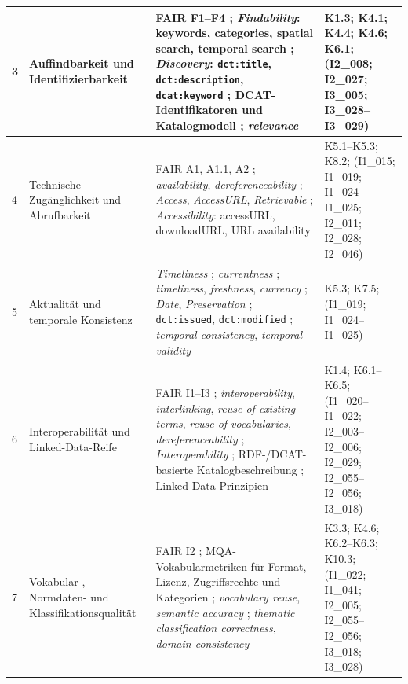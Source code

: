 \begin{center}
\begin{longtable}{p{} p{} p{} p{}}
3 &
Auffindbarkeit und Identifizierbarkeit &
FAIR F1--F4 \cite{wilkinson2016fair}; \textit{Findability}: keywords, categories, spatial search, temporal search \cite{wentzel2023extensive,data_europa}; \textit{Discovery}: \texttt{dct:title}, \texttt{dct:description}, \texttt{dcat:keyword} \cite{Neumaier2016MetadataQuality}; DCAT-Identifikatoren und Katalogmodell \cite{W3CDCAT3}; \textit{relevance} \cite{wang1996beyond,Zaveri2016LinkedDataQuality} &
K1.3; K4.1; K4.4; K4.6; K6.1; (I2\_008; I2\_027; I3\_005; I3\_028--I3\_029) \\ \hline

4 &
Technische Zugänglichkeit und Abrufbarkeit &
FAIR A1, A1.1, A2 \cite{wilkinson2016fair}; \textit{availability}, \textit{dereferenceability} \cite{Zaveri2016LinkedDataQuality}; \textit{Access}, \textit{AccessURL}, \textit{Retrievable} \cite{Neumaier2016MetadataQuality}; \textit{Accessibility}: accessURL, downloadURL, URL availability \cite{wentzel2023extensive,data_europa} &
K5.1--K5.3; K8.2; (I1\_015; I1\_019; I1\_024--I1\_025; I2\_011; I2\_028; I2\_046) \\ \hline

5 &
Aktualität und temporale Konsistenz &
\textit{Timeliness} \cite{wang1996beyond}; \textit{currentness} \cite{iso25012}; \textit{timeliness}, \textit{freshness}, \textit{currency} \cite{Zaveri2016LinkedDataQuality}; \textit{Date}, \textit{Preservation} \cite{Neumaier2016MetadataQuality}; \texttt{dct:issued}, \texttt{dct:modified} \cite{wentzel2023extensive,data_europa}; \textit{temporal consistency}, \textit{temporal validity} \cite{noguerasiso_quality_metadata} &
K5.3; K7.5; (I1\_019; I1\_024--I1\_025) \\ \hline

6 &
Interoperabilität und Linked-Data-Reife &
FAIR I1--I3 \cite{wilkinson2016fair}; \textit{interoperability}, \textit{interlinking}, \textit{reuse of existing terms}, \textit{reuse of vocabularies}, \textit{dereferenceability} \cite{Zaveri2016LinkedDataQuality}; \textit{Interoperability} \cite{wentzel2023extensive,data_europa}; RDF-/DCAT-basierte Katalogbeschreibung \cite{W3CDCAT3,W3CRDF11Concepts}; Linked-Data-Prinzipien \cite{BernersLee2006LinkedData} &
K1.4; K6.1--K6.5; (I1\_020--I1\_022; I2\_003--I2\_006; I2\_029; I2\_055--I2\_056; I3\_018) \\ \hline

7 &
Vokabular-, Normdaten- und Klassifikationsqualität &
FAIR I2 \cite{wilkinson2016fair}; MQA-Vokabularmetriken für Format, Lizenz, Zugriffsrechte und Kategorien \cite{wentzel2023extensive,data_europa}; \textit{vocabulary reuse}, \textit{semantic accuracy} \cite{Zaveri2016LinkedDataQuality}; \textit{thematic classification correctness}, \textit{domain consistency} \cite{noguerasiso_quality_metadata} &
K3.3; K4.6; K6.2--K6.3; K10.3; (I1\_022; I1\_041; I2\_005; I2\_055--I2\_056; I3\_018; I3\_028) \\ \hline


\end{longtable}
\end{center}
